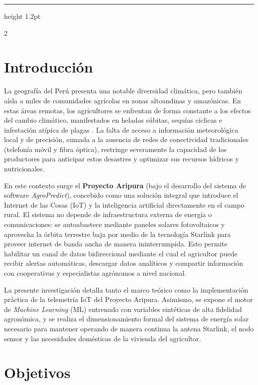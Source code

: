 \documentclass[a4paper, 11pt]{article}
\begin{document}
\hrule height 1.2pt
\vspace{5mm}

\begin{multicols}{2}

\section{Introducción}
La geografía del Perú presenta una notable diversidad climática, pero también aísla a miles de comunidades agrícolas en zonas altoandinas y amazónicas. En estas áreas remotas, los agricultores se enfrentan de forma constante a los efectos del cambio climático, manifestados en heladas súbitas, sequías cíclicas e infestación atípica de plagas \cite{ref1}. La falta de acceso a información meteorológica local y de precisión, sumada a la ausencia de redes de conectividad tradicionales (telefonía móvil y fibra óptica), restringe severamente la capacidad de los productores para anticipar estos desastres y optimizar sus recursos hídricos y nutricionales.

En este contexto surge el \textbf{Proyecto Aripura} (bajo el desarrollo del sistema de software \textit{AgroPredict}), concebido como una solución integral que introduce el Internet de las Cosas (IoT) y la inteligencia artificial directamente en el campo rural. El sistema no depende de infraestructura externa de energía o comunicaciones: se autoabastece mediante paneles solares fotovoltaicos y aprovecha la órbita terrestre baja por medio de la tecnología Starlink para proveer internet de banda ancha de manera ininterrumpida. Esto permite habilitar un canal de datos bidireccional mediante el cual el agricultor puede recibir alertas automáticas, descargar datos analíticos y compartir información con cooperativas y especialistas agrónomos a nivel nacional.

La presente investigación detalla tanto el marco teórico como la implementación práctica de la telemetría IoT del Proyecto Aripura. Asimismo, se expone el motor de \textit{Machine Learning} (ML) entrenado con variables sintéticas de alta fidelidad agronómica, y se realiza el dimensionamiento formal del sistema de energía solar necesario para mantener operando de manera continua la antena Starlink, el nodo sensor y las necesidades domésticas de la vivienda del agricultor.

\section{Objetivos}


\end{multicols}
\end{document}
